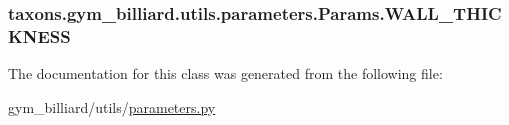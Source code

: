\subsubsection[{\texorpdfstring{W\+A\+L\+L\+\_\+\+T\+H\+I\+C\+K\+N\+E\+SS}{WALL_THICKNESS}}]{\setlength{\rightskip}{0pt plus 5cm}taxons.\+gym\+\_\+billiard.\+utils.\+parameters.\+Params.\+W\+A\+L\+L\+\_\+\+T\+H\+I\+C\+K\+N\+E\+SS}\hypertarget{classtaxons_1_1gym__billiard_1_1utils_1_1parameters_1_1_params_af3284773b9e0ad46c41a6b4c2ca7fa1d}{}\label{classtaxons_1_1gym__billiard_1_1utils_1_1parameters_1_1_params_af3284773b9e0ad46c41a6b4c2ca7fa1d}


The documentation for this class was generated from the following file\+:\begin{DoxyCompactItemize}
\item 
gym\+\_\+billiard/utils/\hyperlink{gym__billiard_2utils_2parameters_8py}{parameters.\+py}\end{DoxyCompactItemize}
